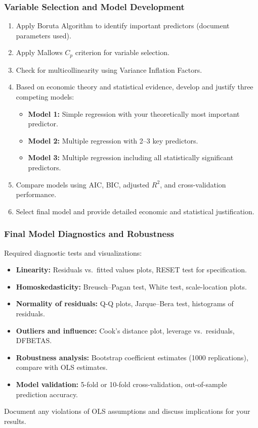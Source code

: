 \subsubsection{Variable Selection and Model Development}
\begin{enumerate}
    \item Apply Boruta Algorithm to identify important predictors (document parameters used).
    \item Apply Mallows $C_p$ criterion for variable selection.
    \item Check for multicollinearity using Variance Inflation Factors.
    \item Based on economic theory and statistical evidence, develop and justify three competing models:
    \begin{itemize}
        \item \textbf{Model 1:} Simple regression with your theoretically most important predictor.
        \item \textbf{Model 2:} Multiple regression with 2--3 key predictors.
        \item \textbf{Model 3:} Multiple regression including all statistically significant predictors.
    \end{itemize}
    \item Compare models using AIC, BIC, adjusted $R^2$, and cross-validation performance.
    \item Select final model and provide detailed economic and statistical justification.
\end{enumerate}

\subsubsection{Final Model Diagnostics and Robustness}
Required diagnostic tests and visualizations:
\begin{itemize}
    \item \textbf{Linearity:} Residuals vs.\ fitted values plots, RESET test for specification.
    \item \textbf{Homoskedasticity:} Breusch--Pagan test, White test, scale-location plots.
    \item \textbf{Normality of residuals:} Q-Q plots, Jarque--Bera test, histograms of residuals.
    \item \textbf{Outliers and influence:} Cook's distance plot, leverage vs.\ residuals, DFBETAS.
    \item \textbf{Robustness analysis:} Bootstrap coefficient estimates (1000 replications), compare with OLS estimates.
    \item \textbf{Model validation:} 5-fold or 10-fold cross-validation, out-of-sample prediction accuracy.
\end{itemize}
Document any violations of OLS assumptions and discuss implications for your results.

